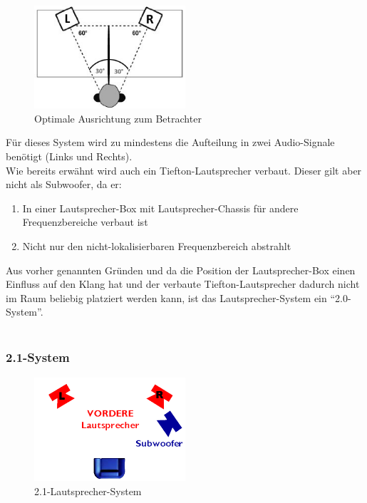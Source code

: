 \begin{figure} [H]
	\centering
	\includegraphics[width=0.5\textwidth]{img/Grundlagen/Mehrweg-Lautsprechersysteme/opt-20-aufstellung.jpg}
	\caption{Optimale Ausrichtung zum Betrachter}
	\label{fig:3.2.4}
\end{figure}

Für dieses System wird zu mindestens die Aufteilung in zwei Audio-Signale benötigt (Links und Rechts).\\
Wie bereits erwähnt wird auch ein Tiefton-Lautsprecher verbaut.
Dieser gilt aber nicht als Subwoofer, da er:
\begin{enumerate}
	\item In einer Lautsprecher-Box mit Lautsprecher-Chassis für andere Frequenzbereiche verbaut ist
	\item Nicht nur den nicht-lokalisierbaren Frequenzbereich abstrahlt
\end{enumerate}
Aus vorher genannten Gründen und da die Position der Lautsprecher-Box einen Einfluss auf den Klang hat und der verbaute Tiefton-Lautsprecher dadurch nicht im Raum beliebig platziert werden kann, ist das Lautsprecher-System ein \enquote{2.0-System}.\\ \\


\newpage
\subsubsection*{2.1-System}
\begin{figure} [H]
	\centering
	\includegraphics[width=0.5\textwidth]{img/Grundlagen/Mehrweg-Lautsprechersysteme/DOLBYDigital21-cut.jpg}
	\caption{2.1-Lautsprecher-System}
	\label{fig:3.2.5}
\end{figure}

